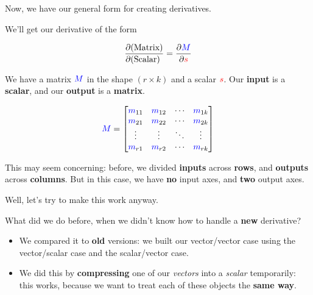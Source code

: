         Now, we have our general form for creating derivatives.
        
        We'll get our derivative of the form 
        
        \begin{equation}
            \frac{\partial  \text{(Matrix)} }{\partial  \text{(Scalar) } }
            =
            \frac{\partial  \textcolor{blue}{M} }{\partial  \textcolor{red}{s} } 
        \end{equation}
        
        We have a matrix $\textcolor{blue}{M}$ in the shape $(r \times k)$ and a scalar $\textcolor{red}{s}$. Our \textbf{input} is a \textbf{scalar}, and our \textbf{output} is a \textbf{matrix}.
        
        \begin{equation}
            \textcolor{blue}{M}
            =
            \begin{bmatrix}
                \textcolor{blue}{m}_{11} & \textcolor{blue}{m}_{12} & \cdots & \textcolor{blue}{m}_{1k} \\ 
                \textcolor{blue}{m}_{21} & \textcolor{blue}{m}_{22} & \cdots & \textcolor{blue}{m}_{2k} \\ 
                \vdots       & \vdots       & \ddots & \vdots     \\
                \textcolor{blue}{m}_{r1} & \textcolor{blue}{m}_{r2} & \cdots & \textcolor{blue}{m}_{rk} \\ 
            \end{bmatrix}
        \end{equation}
        
        This may seem concerning: before, we divided \textbf{inputs} across \textbf{rows}, and \textbf{outputs} across \textbf{columns}. But in this case, we have \textbf{no} input axes, and \textbf{two} output axes. 
        
        Well, let's try to make this work anyway. 
        
        What did we do before, when we didn't know how to handle a \textbf{new} derivative? 
        
        \begin{itemize}
            \item We compared it to \textbf{old} versions: we built our vector/vector case using the vector/scalar case and the scalar/vector case.

            \item We did this by \textbf{compressing} one of our \textit{vectors} into a \textit{scalar} temporarily: this works, because we want to treat each of these objects the \textbf{same way}.
        \end{itemize}
        
